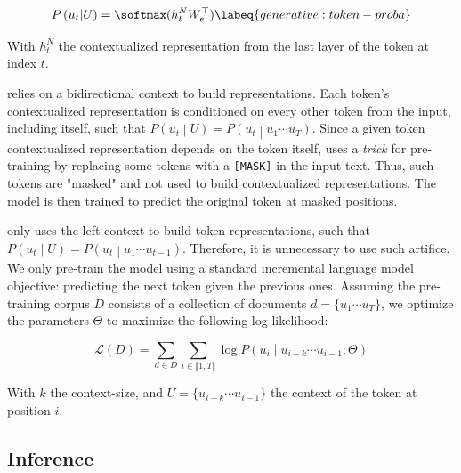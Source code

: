 \begin{equation}
    P\left(u_t \middle| U \right) = \softmax(h_t^N W_e^{\top}) \labeq{generative:token-proba} \\
\end{equation}

With $h_t^N$ the contextualized representation from the last layer of the token at index $t$. 

\bert relies on a bidirectional context to build representations. Each token’s contextualized representation is conditioned on every other token from the input, including itself, such that $P\left(u_t \middle| U \right) = P\left(u_t \middle| u_1 \cdots u_T \right)$. Since a given token contextualized representation depends on the token itself, \bert uses a \textit{trick} for pre-training by replacing some tokens with a \texttt{[MASK]} in the input text. Thus, such tokens are "masked" and not used to build contextualized representations. The model is then trained to predict the original token at masked positions. 

\gpt only uses the left context to build token representations, such that $P\left(u_t \middle| U \right) = P\left(u_t \middle| u_1 \cdots u_{t-1} \right)$. Therefore, it is unnecessary to use such artifice. We only pre-train the model using a standard incremental language model objective: predicting the next token given the previous ones. Assuming the pre-training corpus $D$ consists of a collection of documents $d=\{u_1 \cdots u_T\}$, we optimize the \gpt parameters $\Theta$ to maximize the following log-likelihood:%

\begin{equation}
    \mathcal{L}(D) = \sum_{d \in D}\sum_{i \in \llbracket 1, T \rrbracket} \log P\left(u_{i} \middle| u_{i-k} \cdots u_{i-1}; \Theta\right)
\end{equation}

With $k$ the context-size, and $U=\{u_{i-k} \cdots u_{i-1}\}$ the context of the token at position $i$.


\subsection{Inference}

